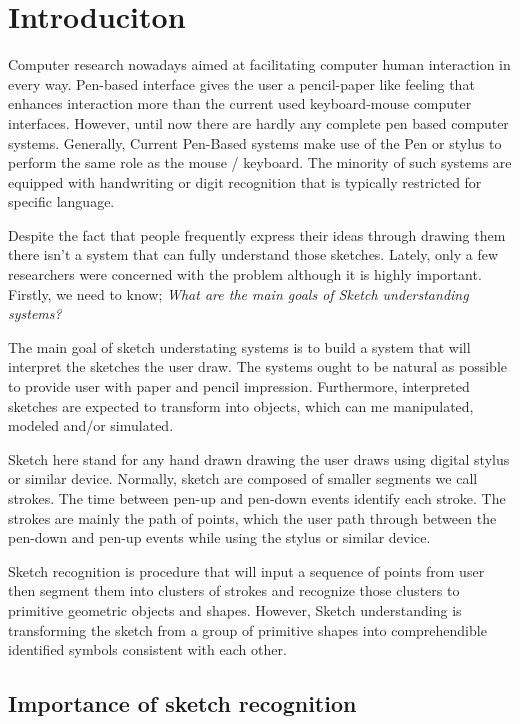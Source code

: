 \chapter {Introduciton}

Computer research nowadays aimed at facilitating computer human interaction in every way. Pen-based interface gives the user a pencil-paper like feeling that enhances interaction more than the current used keyboard-mouse computer interfaces. However, until now there are hardly any complete pen based computer systems. Generally, Current Pen-Based systems make use of the Pen or stylus to perform the same role as the mouse / keyboard. The minority of such systems are equipped with handwriting or digit recognition that is typically restricted for specific language. 

 Despite the fact that people frequently express their ideas through drawing them there isn't a system that can fully understand those sketches. Lately, only a few researchers were concerned with the problem although it is highly important.  
Firstly, we need to know;
 \textit { What are the main goals of Sketch understanding systems?}

The main goal of sketch understating systems is to build a system that will interpret the sketches the user draw. The systems ought to be natural as possible to provide user with paper and pencil impression. Furthermore, interpreted sketches are expected to transform into objects, which can me manipulated, modeled and/or simulated. 

Sketch here stand for any hand drawn drawing the user draws using digital stylus or similar device. Normally, sketch are composed of smaller segments we call strokes. The time between pen-up and pen-down events identify each stroke.  The strokes are mainly the path of points, which the user path through between the pen-down and pen-up events while using the stylus or similar device. 

Sketch recognition is procedure that will input a sequence of points from user then segment them into clusters of strokes and recognize those clusters to primitive geometric objects and shapes. However, Sketch understanding is transforming the sketch from a group of primitive shapes into comprehendible identified symbols consistent with each other.

\section{Importance of sketch recognition}
\label{sec:ImportanceOfSketchRecognition}

